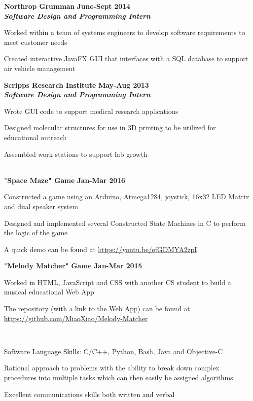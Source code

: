 \documentclass[10pt]{article}
\newcommand{\thing}[1][]{\item #1}
\newcommand{\sectionheader}[1]{
    \vspace{3pt}
    \StrSplit{#1}{3}{\firstpart}{\lastpart} %
    \textbf{\LARGE
        \firstpart
        \lastpart
    }\\[5pt]
}
\newcommand{\dates}[2]{
    \textbf{#1-#2}
}
\begin{document}
    \textbf{\large Northrop Grumman} \hfill \dates{June}{Sept 2014}\\
    \textit{\textbf{Software Design and Programming Intern}}
    \begin{things}
        \thing Worked within a team of systems engineers to develop
                software requirements to meet customer needs
        \thing Created interactive JavaFX GUI that interfaces with a
                SQL database to support air vehicle management
    \end{things}


    \textbf{\large Scripps Research Institute} \hfill \dates{May}{Aug 2013}\\
    \textit{\textbf{Software Design and Programming Intern}}
    \begin{things}
        \thing Wrote GUI code to support medical research applications
        \thing Designed molecular structures for use in 3D printing
                to be utilized for educational outreach
        \thing Assembled work stations to support lab growth
    \end{things}

    \sectionheader{Projects}
    \textbf{\large "Space Maze" Game} \hfill \dates{Jan}{Mar 2016}
    \begin{things}
        \thing Constructed a game using an Arduino, Atmega1284,
                joystick, 16x32 LED Matrix and dual speaker system
        \thing Designed and implemented several Constructed State
                Machines in C to perform the logic of the game
        \thing A quick demo can be found at \url{https://youtu.be/efGDMYA2zpI}
    \end{things}

    \textbf{\large "Melody Matcher" Game} \hfill \dates{Jan}{Mar 2015}
    \begin{things}
        \thing Worked in HTML, JavaScript and CSS with another
                CS student to build a musical educational Web App
        \thing The repository (with a link to the Web App) can be
                found at \url{https://github.com/MiaoXiao/Melody-Matcher}
    \end{things}

    \sectionheader{Skills}
    \vspace{-15pt} %
    \begin{things}
        \thing Software Language Skills: C/C++, Python, Bash,
                Java and Objective-C
        \thing Rational approach to problems with the ability to
                break down complex procedures into multiple tasks
                which can then easily be assigned algorithms
        \thing Excellent communications skills both written and verbal
    \end{things}
\end{document}
